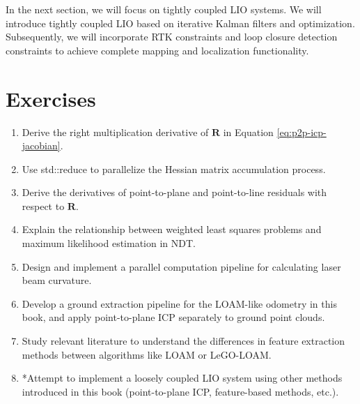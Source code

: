 In the next section, we will focus on tightly coupled LIO systems. We will introduce tightly coupled LIO based on iterative Kalman filters and optimization. Subsequently, we will incorporate RTK constraints and loop closure detection constraints to achieve complete mapping and localization functionality.

\section*{Exercises}
\begin{enumerate}
	\item Derive the right multiplication derivative of $\bm{R}$ in Equation \eqref{eq:p2p-icp-jacobian}.
	\item Use std::reduce to parallelize the Hessian matrix accumulation process.
	\item Derive the derivatives of point-to-plane and point-to-line residuals with respect to $\bm{R}$.
	\item Explain the relationship between weighted least squares problems and maximum likelihood estimation in NDT.
	\item Design and implement a parallel computation pipeline for calculating laser beam curvature.
	\item Develop a ground extraction pipeline for the LOAM-like odometry in this book, and apply point-to-plane ICP separately to ground point clouds.
	\item Study relevant literature to understand the differences in feature extraction methods between algorithms like LOAM or LeGO-LOAM.
	\item *Attempt to implement a loosely coupled LIO system using other methods introduced in this book (point-to-plane ICP, feature-based methods, etc.).
\end{enumerate}

